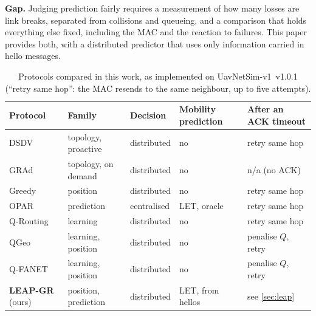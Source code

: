 \textbf{Gap.} Judging prediction fairly requires a measurement of how many losses are link breaks, separated
from collisions and queueing, and a comparison that holds everything else fixed, including the MAC and the
reaction to failures. This paper provides both, with a distributed predictor that uses only information
carried in hello messages.

\begin{table}[t]
\centering
\caption{Protocols compared in this work, as implemented on UavNetSim-v1~v1.0.1 (``retry same hop'': the MAC resends to the same neighbour, up to five attempts).}
\label{tab:related}
\footnotesize
\setlength{\tabcolsep}{3pt}
\begin{tabular}{@{}lllll@{}}
\toprule
Protocol & Family & Decision & Mobility prediction & After an ACK timeout \\
\midrule
DSDV~\cite{perkins1994dsdv} & topology, proactive & distributed & no & retry same hop \\
GRAd~\cite{poor2001grad} & topology, on demand & distributed & no & n/a (no ACK) \\
Greedy~\cite{karp2000gpsr} & position & distributed & no & retry same hop \\
OPAR~\cite{gharib2021opar} & prediction & centralised & LET, oracle & retry same hop \\
Q-Routing~\cite{boyan1993qrouting} & learning & distributed & no & retry same hop \\
QGeo~\cite{jung2017qgeo} & learning, position & distributed & no & penalise $Q$, retry \\
Q-FANET~\cite{dacosta2021qfanet} & learning, position & distributed & no & penalise $Q$, retry \\
\textbf{LEAP-GR} (ours) & position, prediction & distributed & LET, from hellos & see \cref{sec:leap} \\
\bottomrule
\end{tabular}
\end{table}
